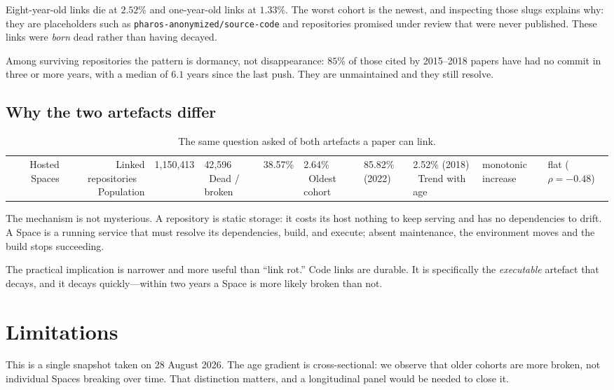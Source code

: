 \documentclass[11pt]{article}
\begin{document}
Eight-year-old links die at $2.52\%$ and one-year-old links at $1.33\%$. The
worst cohort is the newest, and inspecting those slugs explains why: they are
placeholders such as \texttt{pharos-anonymized/source-code} and repositories
promised under review that were never published. These links were \emph{born}
dead rather than having decayed.

Among surviving repositories the pattern is dormancy, not disappearance:
$85\%$ of those cited by 2015--2018 papers have had no commit in three or more
years, with a median of $6.1$ years since the last push. They are unmaintained
and they still resolve.

\subsection{Why the two artefacts differ}

\begin{table}[h]
\centering
\small
\begin{tabular}{lrr}
\toprule
& Hosted Spaces & Linked repositories \
\midrule
Population & 1{,}150{,}413 & 42{,}596 \
Dead / broken & 38.57\% & 2.64\% \
Oldest cohort & 85.82\% (2022) & 2.52\% (2018) \
Trend with age & monotonic increase & flat ($\rho = -0.48$) \
\bottomrule
\end{tabular}
\caption{The same question asked of both artefacts a paper can link.}
\label{tab:contrast}
\end{table}

The mechanism is not mysterious. A repository is static storage: it costs its
host nothing to keep serving and has no dependencies to drift. A Space is a
running service that must resolve its dependencies, build, and execute; absent
maintenance, the environment moves and the build stops succeeding.

The practical implication is narrower and more useful than ``link rot.'' Code
links are durable. It is specifically the \emph{executable} artefact that
decays, and it decays quickly---within two years a Space is more likely broken
than not.


\section{Limitations}
\label{sec:limitations}

This is a single snapshot taken on 28 August 2026. The age gradient is
cross-sectional: we observe that older cohorts are more broken, not individual
Spaces breaking over time. That distinction matters, and a longitudinal panel
would be needed to close it.
\end{document}
